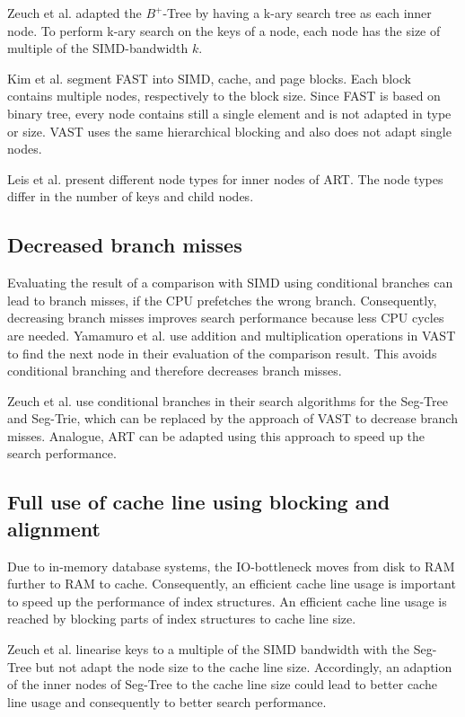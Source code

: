 \documentclass[conference]{IEEEtran}
\begin{document}
Zeuch et al. adapted the $B^+$-Tree by having a k-ary search tree as each inner node. To perform k-ary search on the keys of a node, each node has the size of multiple of the SIMD-bandwidth $k$.

Kim et al. segment FAST into SIMD, cache, and page blocks. Each block contains multiple nodes, respectively to the block size. Since FAST is based on binary tree, every node contains still a single element and is not adapted in type or size. VAST uses the same hierarchical blocking and also does not adapt single nodes.

Leis et al. present different node types for inner nodes of ART. The node types differ in the number of keys and child nodes. 

\subsection{Decreased branch misses}
Evaluating the result of a comparison with SIMD using conditional branches can lead to branch misses, if the CPU prefetches the wrong branch. Consequently, decreasing branch misses improves search performance because less CPU cycles are needed. Yamamuro et al. use addition and multiplication operations in VAST to find the next node in their evaluation of the comparison result. This avoids conditional branching and therefore decreases branch misses.

Zeuch et al. use conditional branches in their search algorithms for the Seg-Tree and Seg-Trie, which can be replaced by the approach of VAST to decrease branch misses. Analogue, ART can be adapted using this approach to speed up the search performance.
\subsection{Full use of cache line using blocking and alignment}
Due to in-memory database systems, the IO-bottleneck moves from disk to RAM further to RAM to cache. Consequently, an efficient cache line usage is important to speed up the performance of index structures. An efficient cache line usage is reached by blocking parts of index structures to cache line size.

Zeuch et al. linearise keys to a multiple of the SIMD bandwidth with the Seg-Tree but not adapt the node size to the cache line size. Accordingly, an adaption of the inner nodes of Seg-Tree to the cache line size could lead to better cache line usage and consequently to better search performance. 
\end{document}
